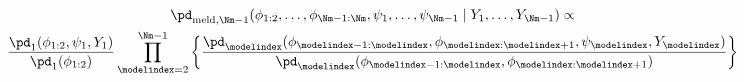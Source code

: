 \begin{multline}
  \pd_{\text{meld}, \Nm - 1}(\phi_{1:2}, \ldots, \phi_{\Nm - 1:\Nm}, \psi_{1}, \ldots, \psi_{\Nm - 1} \mid Y_{1}, \ldots, Y_{\Nm - 1}) \propto \\
  \frac {
    \pd_{1} (\phi_{1:2}, \psi_{1}, Y_{1})
  } {
    \pd_{1}(\phi_{1:2})
  }
  \prod_{\modelindex = 2}^{\Nm - 1} \left\{
    \frac {
      \pd_{\modelindex} (\phi_{\modelindex - 1:\modelindex}, \phi_{\modelindex:\modelindex + 1}, \psi_{\modelindex}, Y_{\modelindex})
    } {
      \pd_{\modelindex}(\phi_{\modelindex - 1:\modelindex}, \phi_{\modelindex:\modelindex + 1})
    }
  \right\}
  \label{eqn:stage-Mminus1-target}
\end{multline}\\